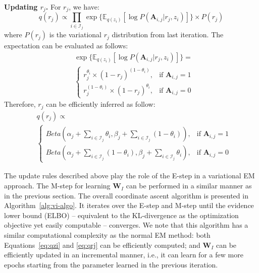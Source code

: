 \smallskip
\noindent\textbf{Updating $r_j$.}  For $r_j$, we have:
%
\begin{equation}
    q(r_j) \propto \prod_{i \in \mathcal{I}_j} \exp{\{\mathbb{E}_{q(z_i)}[\log{P(\mathbf{A}_{i,j}|r_j,z_i)}]\}} \times   {P(r_j)}
\end{equation}
%
where $P(r_j)$ is the variational $r_j$ distribution from last iteration. The expectation can be evaluated as follows:
%
\begin{align}  
& \exp{\{\mathbb{E}_{q(z_i)}[\log{P(\mathbf{A}_{i,j}|r_j,z_i)}]\}} = \nonumber \\
& 
\left\{  
    \begin{array}{lr}
        r_j^{\theta_i}  \times (1-r_j)^{(1 - \theta_i)}, &  \text{if\ } \mathbf{A}_{i,j}=1\\  
        r_j^{(1 - \theta_i)}  \times (1-r_j)^{\theta_i}, &  \text{if\ } \mathbf{A}_{i,j}=0   
    \end{array}  
\right.  
\end{align}
%
Therefore, $r_j$ can be efficiently inferred as follow:
%
\begin{align}  
& q(r_j)  \propto \nonumber \\
& 
\left\{  
    \begin{array}{lr}
        Beta(\alpha_j+\sum_{i\in \mathcal{I}_j}  \theta_i,\beta_j+ \sum_{i\in \mathcal{I}_j} (1 - \theta_i) ), &  \text{if\ } \mathbf{A}_{i,j}=1\\  
        Beta(\alpha_j+\sum_{i\in \mathcal{I}_j} (1 - \theta_i),\beta_j+ \sum_{i\in \mathcal{I}_j} \theta_i), &  \text{if\ } \mathbf{A}_{i,j}=0   
    \end{array}  
\right.  
\label{eq:qrj}
\end{align}



The update rules described above play the role of the E-step in a variational EM approach. 
The M-step for learning $\mathbf{W}_I$ can be performed in a similar manner as in the previous section. The overall coordinate ascent algorithm is presented in Algorithm~\ref{alg:vi-algo}. It iterates over the E-step and M-step until the evidence lower bound (ELBO) \cite{blei2017variational} -- equivalent to the KL-divergence as the optimization objective yet easily computable -- converges. We note that this algorithm has a similar computational complexity as the normal EM method: both Equations~\ref{eq:qzi} and \ref{eq:qrj} can be efficiently computed; and $\mathbf{W}_I$ can be efficiently updated in an incremental manner, i.e., it can learn for a few more epochs starting from the parameter learned in the previous iteration.

